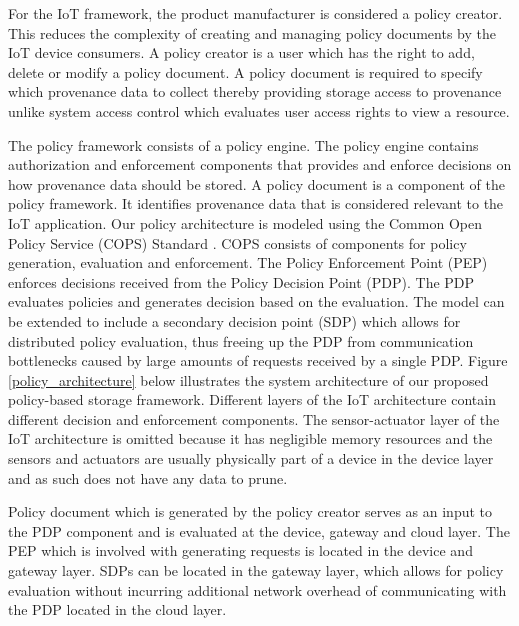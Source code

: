  For the IoT framework, the product manufacturer is considered a policy creator. This reduces the complexity of creating and managing policy documents by the IoT device consumers. A policy creator is a user which has the right to add, delete or modify a policy document. A policy document is required to specify which provenance data to collect thereby providing storage access to provenance unlike system access control which evaluates user access rights to view a resource. 





\par 

The policy framework consists of a policy engine. The policy engine contains authorization and enforcement components that provides and enforce decisions on how provenance data should be stored. A policy document is a component of the policy framework. It identifies provenance data that is considered relevant to the IoT application. Our policy architecture is modeled using the Common Open Policy Service (COPS) Standard \cite{rfc2748}. COPS consists of components for policy generation, evaluation and enforcement. The Policy Enforcement Point (PEP) enforces decisions received from the Policy Decision Point (PDP). The PDP evaluates policies and generates decision based on the evaluation. The model can be extended to include a secondary decision point (SDP) which allows for distributed policy evaluation, thus freeing up the PDP from communication bottlenecks caused by large amounts of requests received by a single PDP. Figure \ref{policy_architecture} below illustrates the system architecture of our proposed policy-based storage framework. Different layers of the IoT architecture contain different decision and enforcement components. The sensor-actuator layer of the IoT architecture is omitted because it has negligible memory resources and the  sensors and actuators are usually physically part of a device in the device layer and as such does not have any data to prune. 


Policy document which is generated by the policy creator serves as an input to the PDP component and is evaluated at the device, gateway and cloud layer. The PEP which is involved with generating requests is located in the device and gateway layer. SDPs can be located in the gateway layer, which allows for policy evaluation without incurring additional network overhead of communicating with the PDP located in the cloud layer. 




